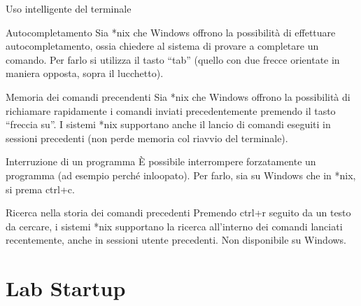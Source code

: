 \documentclass[presentation]{beamer}
\begin{document}
\begin{frame}[fragile]{Uso intelligente del terminale}
  \begin{block}{Autocompletamento}
    \scriptsize{}
    Sia *nix che Windows offrono la possibilità di effettuare autocompletamento, ossia chiedere al sistema di provare a completare un comando. Per farlo si utilizza il tasto ``tab'' (quello con due frecce orientate in maniera opposta, sopra il lucchetto).
  \end{block}
  \begin{block}{Memoria dei comandi precendenti}
    \scriptsize{}
    Sia *nix che Windows offrono la possibilità di richiamare rapidamente i comandi inviati precedentemente premendo il tasto ``freccia su''. I sistemi *nix supportano anche il lancio di comandi eseguiti in sessioni precedenti (non perde memoria col riavvio del terminale). 
  \end{block}
  \begin{block}{Interruzione di un programma}
    \scriptsize{}
    È possibile interrompere forzatamente un programma (ad esempio perché inloopato). Per farlo, sia su Windows che in *nix, si prema ctrl+c.
  \end{block}
  \begin{block}{Ricerca nella storia dei comandi precedenti}
    \scriptsize{}
    Premendo ctrl+r seguito da un testo da cercare, i sistemi *nix supportano la ricerca all'interno dei comandi lanciati recentemente, anche in sessioni utente precedenti. Non disponibile su Windows.
  \end{block}
\end{frame}



\section{Lab Startup}

\end{document}
